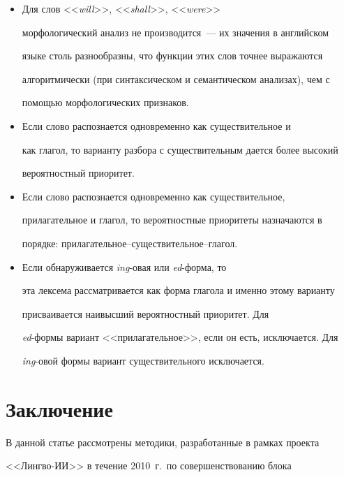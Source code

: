    \begin{itemize}


   \item[(а)] Для слов <<\textit{will}>>, <<\textit{shall}>>, <<\textit{were}>>  


морфологический анализ не производится~--- их значения  в английском 


языке столь разнообразны, что функции этих слов точнее выражаются 


алгоритмически (при синтаксическом и семантическом анализах), чем  с


помощью морфологических признаков.


   \item[(б)] Если слово распознается одновременно как существительное и 


как глагол, то варианту разбора с существительным дается более высокий 


вероятностный приоритет.


   \item[(в)] Если слово распознается одновременно как существительное, 


прилагательное и глагол, то вероятностные приоритеты назначаются в 


порядке: при\-ла\-га\-тель\-ное--существительное--глагол.


   \item[(г)] Если обнаруживается \textit{ing}-овая или \textit{ed}-форма, то 


эта лексема рассматривается как форма глагола и именно этому варианту 


присваивается наивысший вероятностный приоритет. Для 


   \textit{ed}-формы вариант <<прилагательное>>, если он есть, исключается. Для 


\textit{ing}-овой формы вариант существительного исключается.


         \end{itemize}





\section{Заключение}





В данной статье рассмотрены методики, разработанные в рамках проекта 


<<Лингво-ИИ>> в течение 2010~г.\ по совершенствованию блока 



